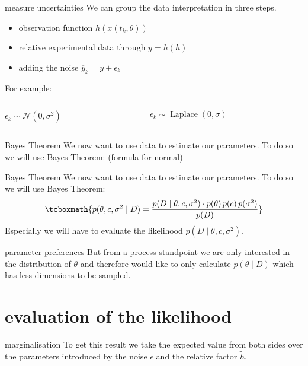 \documentclass{beamer}
\newcommand{\s}{\sigma^2}
\begin{document}
  	\begin{frame}{measure uncertainties}
    	We can group the data interpretation in three steps.
    	\begin{itemize}
    		\item observation function $h(x(t_k,\theta))$
    		\item relative experimental data through $y = \tilde{h}(h)$
    		\item adding the noise $\overline{y}_{k} = y + \epsilon_{k}$
    	\end{itemize}
    	For example:
    	\vspace{0.7cm}
    	\begin{columns}
  			\begin{column}{3cm}
  				$\epsilon_{k} \sim \mathcal{N}(0,\s)$
  			\end{column}
  			\begin{column}{4cm}
 				$\epsilon_{k} \sim \operatorname{Laplace}(0,\sigma)$
  			\end{column}
  		\end{columns}
  	\end{frame}
     
  	\begin{frame}{Bayes Theorem}
  		We now want to use data to estimate our parameters. To 
  		do so we will use Bayes Theorem: (formula for normal)
  	\end{frame}

	\begin{frame}{Bayes Theorem}
  		We now want to use data to estimate our parameters. To 
  		do so we will use Bayes Theorem:
  		\[  \tcboxmath{p(\theta,c,\s \mid D) = \frac{p(D \mid \theta,c,\s) \cdot
  		p(\theta) \, p(c) \, p(\s)}{p(D)}} \]
  		Especially we will have to evaluate the likelihood 
  		$p(D \mid \theta,c,\s)$.
  	\end{frame}
  	
	\begin{frame}{parameter preferences}
  		But from a process standpoint we are only 
  		interested in the distribution of $\theta$ and therefore would like to 
  		only calculate $p(\theta \mid D)$ which has less dimensions to be sampled.
  	\end{frame}
  
\section{evaluation of the likelihood}
  	\begin{frame}{marginalisation}
		To get this result we take the expected value from both sides over the 
		parameters introduced by the noise $\epsilon$ and the relative factor 
		$\tilde{h}$.
  	\end{frame}  
\end{document}
